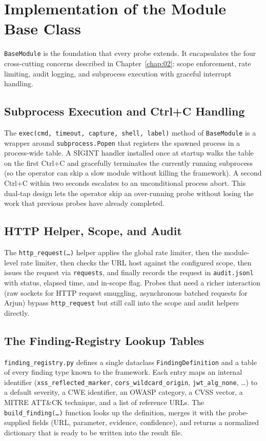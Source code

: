 \section{Implementation of the Module Base Class}

\texttt{BaseModule} is the foundation that every probe extends. It encapsulates the four cross-cutting concerns described in Chapter~\ref{chap:02}: scope enforcement, rate limiting, audit logging, and subprocess execution with graceful interrupt handling.

\subsection{Subprocess Execution and Ctrl+C Handling}

The \texttt{exec(cmd, timeout, capture, shell, label)} method of \texttt{BaseModule} is a wrapper around \texttt{subprocess.Popen} that registers the spawned process in a process-wide table. A SIGINT handler installed once at startup walks the table on the first Ctrl+C and gracefully terminates the currently running subprocess (so the operator can skip a slow module without killing the framework). A second Ctrl+C within two seconds escalates to an unconditional process abort. This dual-tap design lets the operator skip an over-running probe without losing the work that previous probes have already completed.

\subsection{HTTP Helper, Scope, and Audit}

The \texttt{http\_request(\dots)} helper applies the global rate limiter, then the module-level rate limiter, then checks the URL host against the configured scope, then issues the request via \texttt{requests}, and finally records the request in \texttt{audit.jsonl} with status, elapsed time, and in-scope flag. Probes that need a richer interaction (raw sockets for HTTP request smuggling, asynchronous batched requests for Arjun) bypass \texttt{http\_request} but still call into the scope and audit helpers directly.

\subsection{The Finding-Registry Lookup Tables}

\texttt{finding\_registry.py} defines a single dataclass \texttt{FindingDefinition} and a table of every finding type known to the framework. Each entry maps an internal identifier (\texttt{xss\_reflected\_marker}, \texttt{cors\_wildcard\_origin}, \texttt{jwt\_alg\_none}, \dots) to a default severity, a CWE identifier, an OWASP category, a CVSS vector, a MITRE ATT\&CK technique, and a list of reference URLs. The \texttt{build\_finding(\dots)} function looks up the definition, merges it with the probe-supplied fields (URL, parameter, evidence, confidence), and returns a normalized dictionary that is ready to be written into the result file.

